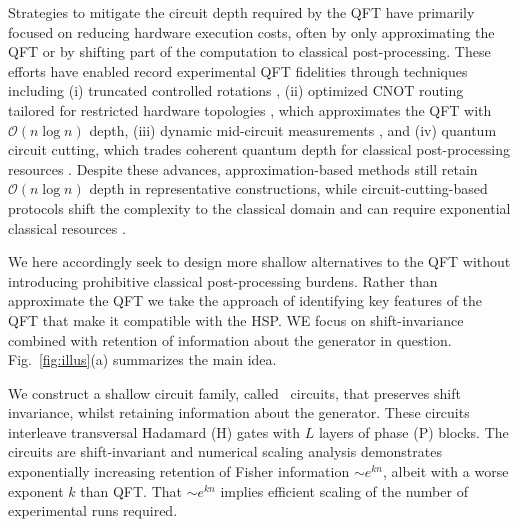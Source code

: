 \documentclass[reprint, aps, prl, superscriptaddress]{revtex4-2}
\newcommand{\myqc}{\text{HP}}
\begin{document}
Strategies to mitigate the circuit depth required by the QFT have primarily focused on reducing hardware execution costs, often by only approximating the QFT or by shifting part of the computation to classical post-processing. These efforts have enabled record experimental QFT fidelities \cite{aumann2026demonstrating} through techniques including (i) truncated controlled rotations \cite{Coppersmith2002}, (ii) optimized CNOT routing tailored for restricted hardware topologies \cite{park2023reducing}, which approximates the QFT with \(\mathcal{O}(n\log n)\) depth, (iii) dynamic mid-circuit measurements \cite{baumer2024quantum}, and (iv) quantum circuit cutting, which trades coherent quantum depth for classical post-processing resources \cite{tang2021cutqc, Peng2020}. Despite these advances, approximation-based methods still retain \(\mathcal{O}(n\log n)\) depth in representative constructions, while circuit-cutting-based protocols shift the complexity to the classical domain and can require exponential classical resources \cite{tang2021cutqc, Peng2020}.










We here accordingly seek to design more  shallow alternatives to the QFT without introducing prohibitive classical post-processing burdens. Rather than approximate the QFT we take the approach of identifying key features of the QFT that make it compatible with the HSP. WE focus on shift-invariance combined with retention of information about the generator in question. Fig.~\ref{fig:illus}(a) summarizes the main idea.


We construct a shallow circuit family, called \myqc~circuits, that preserves shift invariance,  whilst retaining information about the generator. These circuits interleave transversal Hadamard (H) gates with $L$ layers of phase (P) blocks. The circuits are shift-invariant and numerical scaling analysis demonstrates exponentially increasing retention of Fisher information $\sim e^{kn}$, albeit with a worse exponent $k$ than QFT. That $\sim e^{kn}$ implies efficient scaling of the number of experimental runs required. 
\end{document}
